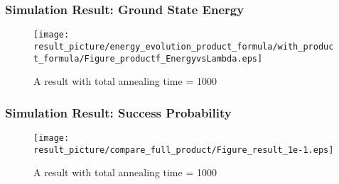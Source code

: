 \documentclass{beamer}
\begin{document}
%		
%
%
%
%		
%

\begin{frame}
	\frametitle{Simulation Result: Ground State Energy}
	\begin{figure}
		\centering
		\texttt{[image: result\_picture/energy\_evolution\_product\_formula/with\_product\_formula/Figure\_productf\_EnergyvsLambda.eps]}
		\caption{A result with total annealing time = 1000}
	\end{figure}
\end{frame}

\begin{frame}
	\frametitle{Simulation Result: Success Probability}
	\begin{figure}
		\centering
		\texttt{[image: result\_picture/compare\_full\_product/Figure\_result\_1e-1.eps]}
		\caption{A result with total annealing time = 1000}
	\end{figure}
\end{frame}
\end{document}
